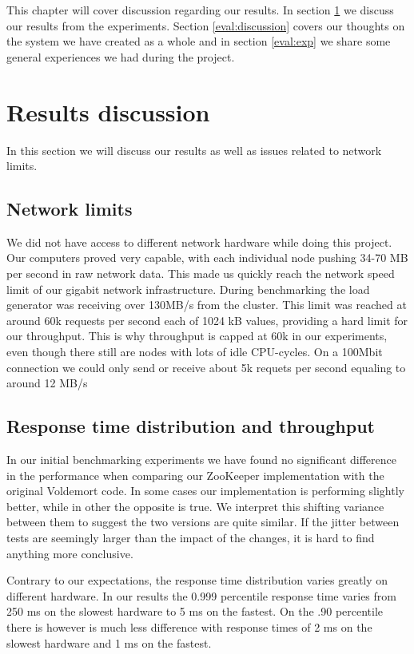 This chapter will cover discussion regarding our results. In section \ref{eval:results} we discuss our results from the experiments. Section \ref{eval:discussion} covers our thoughts on the system we have created as a whole and in section \ref{eval:exp} we share some general experiences we had during the project.

\section{Results discussion}
\label{eval:results}
In this section we will discuss our results as well as issues related to network limits.  

\subsection{Network limits}
We did not have access to different network hardware while doing this project. Our computers proved very capable, with each individual node pushing 34-70 MB per second in raw network data. This made us quickly reach the network speed limit of our gigabit network infrastructure. During benchmarking the load generator was receiving over 130MB/s from the cluster. This limit was reached at around 60k requests per second each of 1024 kB values, providing a hard limit for our throughput. This is why throughput is capped at 60k in our experiments, even though there still are nodes with lots of idle CPU-cycles. On a 100Mbit connection we could only send or receive about 5k requets per second equaling to around 12 MB/s

\subsection{Response time distribution and throughput}
\label{eval:performance}
In our initial benchmarking experiments we have found no significant difference in the performance when comparing our ZooKeeper implementation with the original Voldemort code. In some cases our implementation is performing slightly better, while in other the opposite is true. We interpret this shifting variance between them to suggest the two versions are quite similar. If the jitter between tests are seemingly larger than the impact of the changes, it is hard to find anything more conclusive.

Contrary to our expectations, the response time distribution varies greatly on different hardware. In our results the 0.999 percentile response time varies from 250 ms on the slowest hardware to 5 ms on the fastest. On the .90 percentile there is however is much less difference with response times of 2 ms on the slowest hardware and 1 ms on the fastest.

